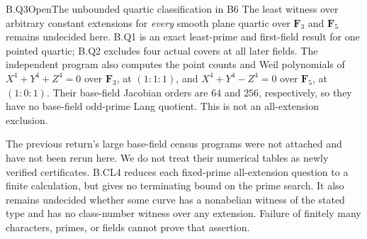 \begin{claim}{B.Q3}{Open}{The unbounded quartic classification in B6}
The least witness over arbitrary constant extensions for
\emph{every} smooth plane quartic over $\mathbf F_3$ and
$\mathbf F_5$ remains undecided here. B.Q1 is an exact
least-prime and first-field result for one pointed quartic;
B.Q2 excludes four actual covers at all later fields.
The independent program 
also computes the point counts and Weil polynomials of
$X^4+Y^4+Z^4=0$ over $\mathbf F_3$, at $(1:1:1)$,
and $X^4+Y^4-Z^4=0$ over $\mathbf F_5$, at $(1:0:1)$.
Their base-field Jacobian orders are $64$ and $256$,
respectively, so they have no base-field odd-prime Lang
quotient. This is not an all-extension exclusion.

The previous return's large base-field census programs were
not attached and have not been rerun here. We do not treat
their numerical tables as newly verified certificates.
B.CL4 reduces each fixed-prime all-extension question to a
finite calculation, but gives no terminating bound on the
prime search. It also remains undecided whether some curve
has a nonabelian witness of the stated type and has no
class-number witness over any extension. Failure of finitely
many characters, primes, or fields cannot prove that assertion.
\end{claim}
